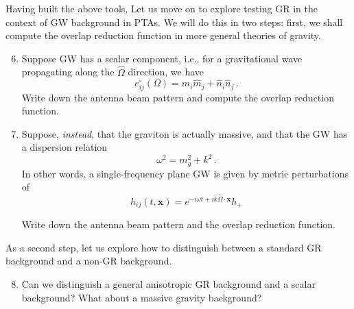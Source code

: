 \documentclass[article, onecolumn, ,nofootinbib,nopreprintnumbers]{revtex4}
\begin{document}
Having built the above tools, Let us move on to explore testing GR in the context of GW background in PTAs.  We will do this in two steps: first, we shall compute the overlap reduction function in more general theories of gravity.  
\begin{enumerate}
\setcounter{enumi}{5}
\item Suppose GW has a scalar component, i.e., for a gravitational wave propagating along the $\hat\Omega$ direction, we have 
\begin{equation}
e^{\circ}_{ij}(\Omega)=\hat m_i\hat m_j+\hat n_i \hat n_j\,.
\end{equation}
Write down the antenna beam pattern and compute the overlap reduction function.  
\item Suppose, {\it instead}, that the graviton is actually massive, and that the GW has a dispersion relation 
\begin{equation}
\omega^2 = m_g^2 +k^2\,.
\end{equation}
In other words, a single-frequency plane GW is given by metric perturbations of  
\begin{equation}
h_{ij} (t,\mathbf{x}) = e^{-i\omega t+ i k\hat\Omega\cdot\mathbf{x}} h_+
\end{equation}

Write down the antenna beam pattern and the overlap reduction function. 
\end{enumerate}
As a second step, let us explore how to distinguish between a standard GR background and a non-GR background. 
\begin{enumerate}
\setcounter{enumi}{7}
\item Can we distinguish a general anisotropic GR background and a scalar background? What about a massive gravity background?
\end{enumerate}



\end{document}

